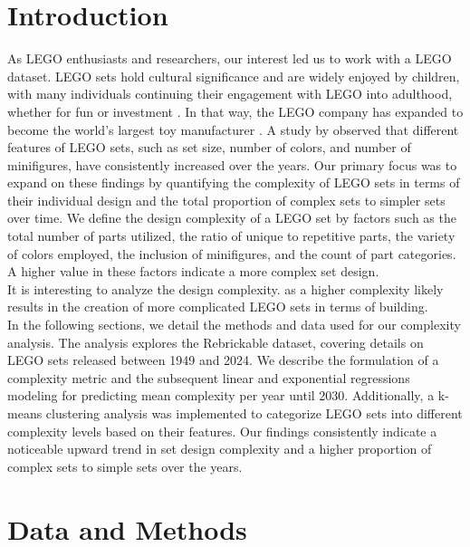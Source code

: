 \documentclass{article}
\theoremstyle{plain}
\theoremstyle{definition}
\theoremstyle{remark}
\begin{document}
\section{Introduction}\label{sec:intro}
As LEGO enthusiasts and researchers, our interest led us to work with a LEGO dataset. LEGO sets hold cultural significance and are widely enjoyed by children, with many individuals continuing their engagement with LEGO into adulthood, whether for fun or investment \cite{dobrynskaya2018LEGO}. In that way, the LEGO company has expanded to become the world's largest toy manufacturer \cite{mazzarella2019let}. A study by \citet{legocomplexity} observed that different features of LEGO sets, such as set size, number of colors, and number of minifigures, have consistently increased over the years. Our primary focus was to expand on these findings by quantifying the complexity of LEGO sets in terms of their individual design and the total proportion of complex sets to simpler sets over time. We define the design complexity of a LEGO set by factors such as the total number of parts utilized, the ratio of unique to repetitive parts, the variety of colors employed, the inclusion of minifigures, and the count of part categories. A higher value in these factors indicate a more complex set design.\\
It is interesting to analyze the design complexity. as a higher complexity likely results in the creation of more complicated LEGO sets in terms of building.\\
In the following sections, we detail the methods and data used for our complexity analysis. The analysis explores the Rebrickable dataset, covering details on LEGO sets released between 1949 and 2024. We describe the formulation of a complexity metric and the subsequent linear and exponential regressions modeling for predicting mean complexity per year until 2030. Additionally, a k-means clustering analysis was implemented to categorize LEGO sets into different complexity levels based on their features. Our findings consistently indicate a noticeable upward trend in set design complexity and a higher proportion of complex sets to simple sets over the years.

\section{Data and Methods}\label{sec:methods}
\end{document}
